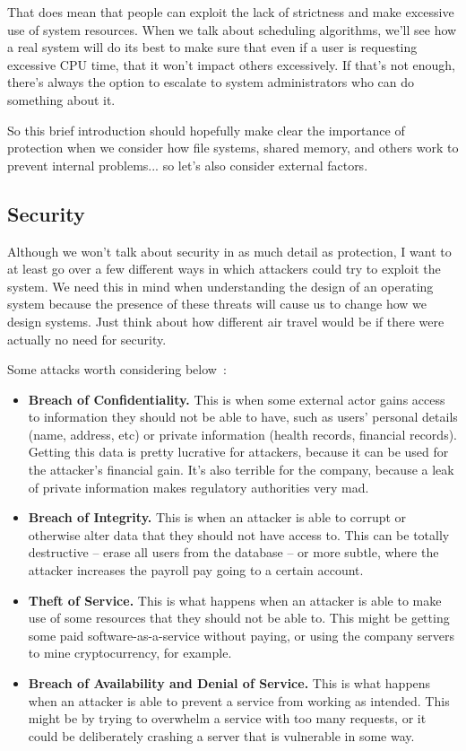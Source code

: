 That does mean that people can exploit the lack of strictness and make excessive use of system resources. When we talk about scheduling algorithms, we'll see how a real system will do its best to make sure that even if a user is requesting excessive CPU time, that it won't impact others excessively. If that's not enough, there's always the option to escalate to system administrators who can do something about it.

So this brief introduction should hopefully make clear the importance of protection when we consider how file systems, shared memory, and others work to prevent internal problems... so let's also consider external factors.

\subsection*{Security}
Although we won't talk about security in as much detail as protection, I want to at least go over a few different ways in which attackers could try to exploit the system. We need this in mind when understanding the design of an operating system because the presence of these threats will cause us to change how we design systems. Just think about how different air travel would be if there were actually no need for security. 

Some attacks worth considering below~\cite{osc}:
\begin{itemize}
	\item \textbf{Breach of Confidentiality.} This is when some external actor gains access to information they should not be able to have, such as users' personal details (name, address, etc) or private information (health records, financial records). Getting this data is pretty lucrative for attackers, because it can be used for the attacker's financial gain. It's also terrible for the company, because a leak of private information makes regulatory authorities very mad.
	
	\item \textbf{Breach of Integrity.} This is when an attacker is able to corrupt or otherwise alter data that they should not have access to. This can be totally destructive -- erase all users from the database -- or more subtle, where the attacker increases the payroll pay going to a certain account. 
	
	\item \textbf{Theft of Service.} This is what happens when an attacker is able to make use of some resources that they should not be able to. This might be getting some paid software-as-a-service without paying, or using the company servers to mine cryptocurrency, for example.
	
	\item \textbf{Breach of Availability and Denial of Service.} This is what happens when an attacker is able to prevent a service from working as intended. This might be by trying to overwhelm a service with too many requests, or it could be deliberately crashing a server that is vulnerable in some way. 
	
\end{itemize}

